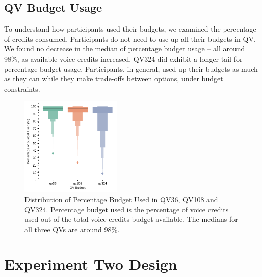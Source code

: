 \subsection{QV Budget Usage}
To understand how participants used their budgets, we examined the percentage of credits consumed. Participants do not need to use up all their budgets in QV. We found no decrease in the median of percentage budget usage -- all around 98\%, as available voice credits increased. QV324 did exhibit a longer tail for percentage budget usage. Participants, in general, used up their budgets as much as they can while they make trade-offs between options, under budget constraints.
\begin{figure}[htpb]
    \centering
    \includegraphics[width=0.43\textwidth, keepaspectratio=true]{content/image/qv_budget_used_distribution.pdf}
    \caption{
      Distribution of Percentage Budget Used in QV36, QV108 and QV324. Percentage budget used is the percentage of voice credits used out of the total voice credits budget available. The medians for all three QVs are around 98\%.
    }
    \label{fig:qv_budget_exp1}
\end{figure}


\section{Experiment Two Design}
